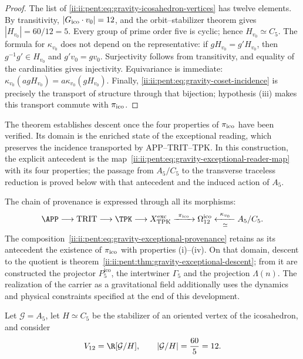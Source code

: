 \begin{proof}
The list of \eqref{ii:ii:pent:eq:gravity-icosahedron-vertices} has twelve elements. By transitivity, \(|G_{\rm ico}\cdot v_0|=12\), and the orbit--stabilizer theorem gives \(|H_{v_0}|=60/12=5\). Every group of prime order five is cyclic; hence \(H_{v_0}\simeq C_5\). The formula for \(\kappa_{v_0}\) does not depend on the representative: if \(gH_{v_0}=g'H_{v_0}\), then \(g^{-1}g'\in H_{v_0}\) and \(g'v_0=gv_0\). Surjectivity follows from transitivity, and equality of the cardinalities gives injectivity. Equivariance is immediate: \(\kappa_{v_0}(agH_{v_0})=a\kappa_{v_0}(gH_{v_0})\). Finally, \eqref{ii:ii:pent:eq:gravity-coset-incidence} is precisely the transport of structure through that bijection; hypothesis (iii) makes this transport commute with \(\pi_{\rm ico}\).
\end{proof}

The theorem establishes descent once the four
properties of \(\pi_{\rm ico}\) have been verified. Its domain is the enriched state
of the exceptional reading, which preserves the incidence transported by
APP--TRIT--TPK. In this construction, the explicit antecedent is the
map~\eqref{ii:ii:pent:eq:gravity-exceptional-reader-map} with its four
properties; the passage from \(A_5/C_5\) to the transverse traceless
reduction is proved below with that antecedent and the induced action
of \(A_5\).

The chain of provenance is expressed through all its morphisms:
\begin{equation}
\label{ii:ii:pent:eq:gravity-exceptional-provenance}
\APP\longrightarrow\mathrm{TRIT}\longrightarrow\TPK
\longrightarrow X_{\rm TPK}^{\rm exc}
\xrightarrow{\ \pi_{\rm ico}\ }\Omega_{12}^{\rm ico}
\xleftarrow[\simeq]{\ \kappa_{v_0}\ }A_5/C_5.
\end{equation}
The composition~\eqref{ii:ii:pent:eq:gravity-exceptional-provenance} retains
as its antecedent the existence of \(\pi_{\rm ico}\) with properties
(i)--(iv). On that domain, descent to the quotient is
theorem~\ref{ii:ii:pent:thm:gravity-exceptional-descent}; from it are constructed
the projector \(P^{\mathrm{ico}}_5\), the intertwiner \(\Gamma_5\) and the
projection \(\Lambda(n)\). The realization of the carrier as a gravitational
field additionally uses the dynamics and physical constraints
specified at the end of this development.

Let \(\mathcal G=A_5\), let \(H\simeq C_5\) be the stabilizer of an oriented vertex
of the icosahedron, and consider
\begin{equation}
\label{ii:ii:pent:eq:gravity-v12}
V_{12}=\R[\mathcal G/H],
\qquad |\mathcal G/H|=\frac{60}{5}=12.
\end{equation}


